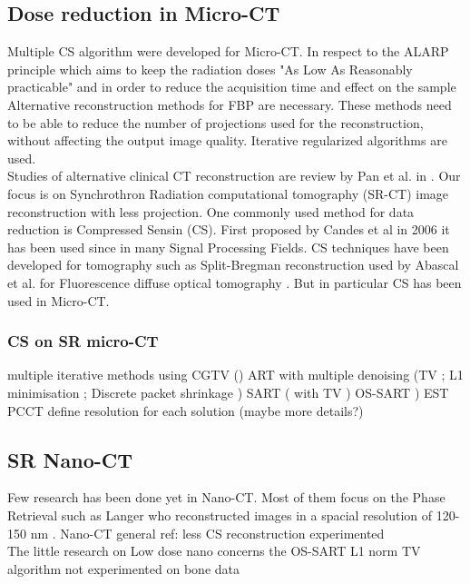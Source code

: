 \subsection{Dose reduction in Micro-CT}
Multiple CS algorithm were developed for Micro-CT. In respect to the ALARP principle which aims to keep the radiation doses "As Low As Reasonably practicable" and in order to reduce the acquisition time and effect on the sample Alternative reconstruction methods for FBP are necessary. These methods need to be able to reduce the number of projections used for the reconstruction, without affecting the output image quality. Iterative regularized algorithms are used.\\
Studies of alternative clinical CT reconstruction are review by Pan et al. in \cite{pan2009commercial}. Our focus is on Synchrothron Radiation computational tomography (SR-CT) image reconstruction with less projection. One commonly used method for data reduction is Compressed Sensin (CS). First proposed by Candes et al in 2006 \cite{candes2006stable} it has been used since in many Signal Processing Fields. CS techniques have been developed for tomography such as Split-Bregman reconstruction \cite{goldstein2009split} used by Abascal et al. for Fluorescence diffuse optical tomography \cite{abascal2011fluorescence}. But in particular CS has been used in Micro-CT.

	\subsubsection{CS on SR micro-CT}
		multiple iterative methods using CGTV (\cite{[12]}) ART with multiple denoising (TV \cite{[3]}; L1 minimisation \cite{[18]}; Discrete packet shrinkage \cite{[2]}) SART (\cite{[1]} with TV \cite{[5]}) OS-SART \cite{[6]}) EST \cite{[15], [16]}  PCCT \cite{[8]}
		 define resolution for each solution (maybe more details?)

\subsection{SR Nano-CT}
	Few research has been done yet in Nano-CT. Most of them focus on the Phase Retrieval such as Langer who reconstructed images in a spacial resolution of 120-150 nm  \cite{langer2012x}.
	Nano-CT general ref: \cite{[23]} %
	less CS reconstruction experimented	\\
	The little research on Low dose nano concerns the OS-SART L1 norm TV algorithm \cite{[10]} not experimented on bone data


